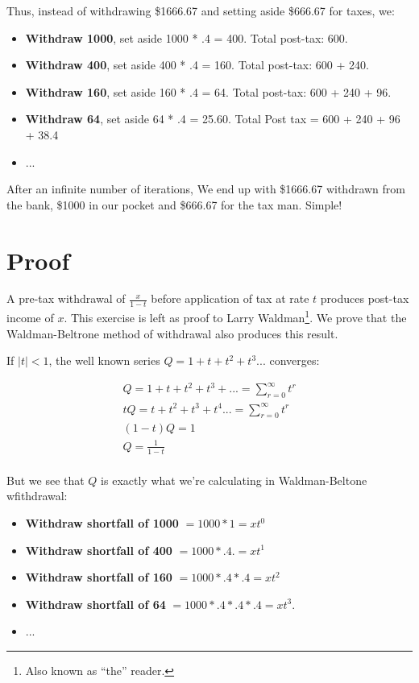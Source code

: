 \documentclass[11pt, oneside]{article} 	%
\begin{document}
Thus, instead of withdrawing \$1666.67 and setting aside \$666.67 for taxes, we:
\begin{itemize}
\item \textbf{Withdraw 1000}, set aside 1000 * .4 = 400.  Total post-tax: 600.
\item \textbf{Withdraw 400}, set aside 400 * .4 = 160.  Total post-tax: 600 + 240.
\item \textbf{Withdraw 160}, set aside 160 * .4 = 64.   Total post-tax: 600 + 240 + 96.
\item \textbf{Withdraw 64}, set aside 64 * .4 = 25.60.  Total Post tax = 600 + 240 + 96 + 38.4
\item ... 
\end{itemize}

After an infinite number of iterations, We end up with \$1666.67 withdrawn from the bank, \$1000 in our pocket and \$666.67 for the tax man.  Simple!

\section{Proof} 

A pre-tax withdrawal of  $\frac{x}{1-t}$  before application of tax at rate $t$ produces post-tax income of $x$.  This exercise is left as proof to Larry Waldman\footnote{Also known as ``the'' reader.}.  We prove that the Waldman-Beltrone method of withdrawal also produces this result. 

 If $|t| < 1$, the well known series $Q = 1 + t + t^2 + t^3 ...$ converges:

\begin{align}
Q = 1 + t + t^2 + t^3 + ... = \sum_{r=0}^{\infty} t^r\\ 
tQ = t  + t^2 + t^3 + t^4 ... = \sum_{r=0}^{\infty} t^r \\
(1-t)Q = 1 \\
Q = \frac{1}{1-t} \\
\end{align}

But we see that $Q$ is exactly what we're calculating in Waldman-Beltone wfithdrawal:

\begin{itemize}
\item \textbf{Withdraw shortfall of 1000} $ = 1000 * 1 = xt^0$
\item \textbf{ Withdraw shortfall of 400} $= 1000 * .4. = xt^1$
\item \textbf{Withdraw shortfall of 160} $= 1000 * .4 * .4 = xt^2$
\item \textbf{Withdraw shortfall of 64} $= 1000 * .4 * .4 * .4  = xt^3$.
\item ...
\end{itemize}
\end{document}
